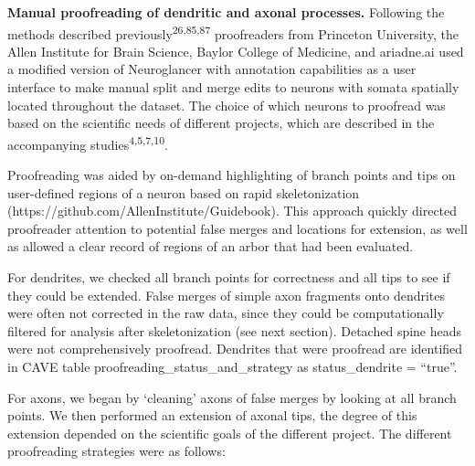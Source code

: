 \documentclass{article}
\begin{document}
\textbf{Manual proofreading of dendritic and axonal processes.} Following the methods described previously\textsuperscript{26,85,87} proofreaders from Princeton University, the Allen Institute for Brain Science, Baylor College of Medicine, and ariadne.ai used a modified version of Neuroglancer with annotation capabilities as a user interface to make manual split and merge edits to neurons with somata spatially located throughout the dataset. The choice of which neurons to proofread was based on the scientific needs of different projects, which are described in the accompanying studies\textsuperscript{4,5,7,10}.

Proofreading was aided by on-demand highlighting of branch points and tips on user-defined regions of a neuron based on rapid skeletonization (https://github.com/AllenInstitute/Guidebook). This approach quickly directed proofreader attention to potential false merges and locations for extension, as well as allowed a clear record of regions of an arbor that had been evaluated.

For dendrites, we checked all branch points for correctness and all tips to see if they could be extended. False merges of simple axon fragments onto dendrites were often not corrected in the raw data, since they could be computationally filtered for analysis after skeletonization (see next section). Detached spine heads were not comprehensively proofread. Dendrites that were proofread are identified in CAVE table proofreading\_status\_and\_strategy as status\_dendrite = “true”.

For axons, we began by ‘cleaning’ axons of false merges by looking at all branch points. We then performed an extension of axonal tips, the degree of this extension depended on the scientific goals of the different project. The different proofreading strategies were as follows:
\end{document}
